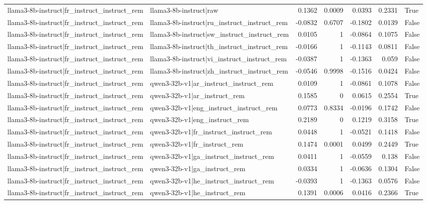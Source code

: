 \begin{table}
\begin{tabular}{l l r r r r l}
llama3-8b-instruct|fr_instruct_instruct_rem & llama3-8b-instruct|raw & 0.1362 & 0.0009 & 0.0393 & 0.2331 & True \\
llama3-8b-instruct|fr_instruct_instruct_rem & llama3-8b-instruct|ru_instruct_instruct_rem & -0.0832 & 0.6707 & -0.1802 & 0.0139 & False \\
llama3-8b-instruct|fr_instruct_instruct_rem & llama3-8b-instruct|sw_instruct_instruct_rem & 0.0105 & 1 & -0.0864 & 0.1075 & False \\
llama3-8b-instruct|fr_instruct_instruct_rem & llama3-8b-instruct|th_instruct_instruct_rem & -0.0166 & 1 & -0.1143 & 0.0811 & False \\
llama3-8b-instruct|fr_instruct_instruct_rem & llama3-8b-instruct|vi_instruct_instruct_rem & -0.0387 & 1 & -0.1363 & 0.059 & False \\
llama3-8b-instruct|fr_instruct_instruct_rem & llama3-8b-instruct|zh_instruct_instruct_rem & -0.0546 & 0.9998 & -0.1516 & 0.0424 & False \\
llama3-8b-instruct|fr_instruct_instruct_rem & qwen3-32b-v1|ar_instruct_instruct_rem & 0.0109 & 1 & -0.0861 & 0.1078 & False \\
llama3-8b-instruct|fr_instruct_instruct_rem & qwen3-32b-v1|ar_instruct_rem & 0.1585 & 0 & 0.0615 & 0.2554 & True \\
llama3-8b-instruct|fr_instruct_instruct_rem & qwen3-32b-v1|eng_instruct_instruct_rem & 0.0773 & 0.8334 & -0.0196 & 0.1742 & False \\
llama3-8b-instruct|fr_instruct_instruct_rem & qwen3-32b-v1|eng_instruct_rem & 0.2189 & 0 & 0.1219 & 0.3158 & True \\
llama3-8b-instruct|fr_instruct_instruct_rem & qwen3-32b-v1|fr_instruct_instruct_rem & 0.0448 & 1 & -0.0521 & 0.1418 & False \\
llama3-8b-instruct|fr_instruct_instruct_rem & qwen3-32b-v1|fr_instruct_rem & 0.1474 & 0.0001 & 0.0499 & 0.2449 & True \\
llama3-8b-instruct|fr_instruct_instruct_rem & qwen3-32b-v1|ga_instruct_instruct_rem & 0.0411 & 1 & -0.0559 & 0.138 & False \\
llama3-8b-instruct|fr_instruct_instruct_rem & qwen3-32b-v1|ga_instruct_rem & 0.0334 & 1 & -0.0636 & 0.1304 & False \\
llama3-8b-instruct|fr_instruct_instruct_rem & qwen3-32b-v1|he_instruct_instruct_rem & -0.0393 & 1 & -0.1363 & 0.0576 & False \\
llama3-8b-instruct|fr_instruct_instruct_rem & qwen3-32b-v1|he_instruct_rem & 0.1391 & 0.0006 & 0.0416 & 0.2366 & True \\

\end{tabular}
\end{table}
